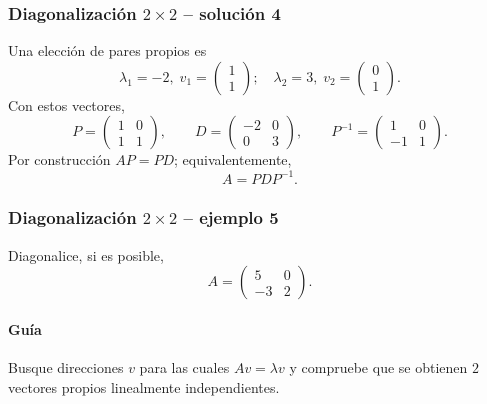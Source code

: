 \subsubsection*{Diagonalización $2\times 2$ -- solución 4}
\scriptsize
Una elección de pares propios es
\[
\lambda_1=-2,\;v_1=\begin{pmatrix}1\\1\end{pmatrix};\quad \lambda_2=3,\;v_2=\begin{pmatrix}0\\1\end{pmatrix}.
\]
Con estos vectores,
\[
P=\begin{pmatrix}1 & 0\\1 & 1\end{pmatrix},\qquad D=\begin{pmatrix}-2 & 0\\0 & 3\end{pmatrix},\qquad P^{-1}=\begin{pmatrix}1 & 0\\-1 & 1\end{pmatrix}.
\]
Por construcción $AP=PD$; equivalentemente,
\[
\boxed{A=PDP^{-1}}.
\]


\subsubsection*{Diagonalización $2\times 2$ -- ejemplo 5}

Diagonalice, si es posible,
\[
A=\begin{pmatrix}5 & 0\\-3 & 2\end{pmatrix}.
\]

\paragraph{Guía}
Busque direcciones $v$ para las cuales $Av=\lambda v$ y compruebe que se obtienen $2$ vectores propios linealmente independientes.



